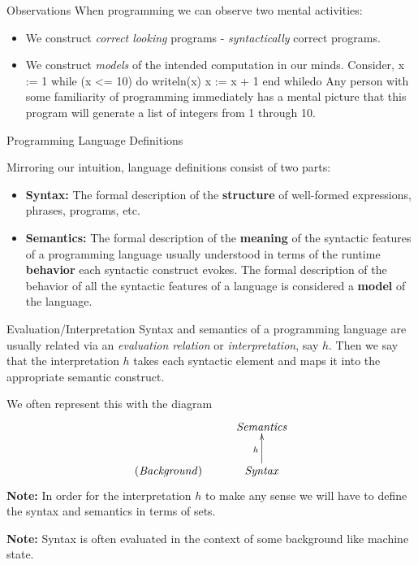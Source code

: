 \documentclass{beamer}
\begin{document}
\begin{frame}[fragile]{Observations}
When programming we can observe two mental activities:
\begin{itemize}
\item We construct {\em correct looking} programs - {\em syntactically} correct programs.
\item We construct {\em models} of the intended computation in our minds. Consider,
\bcode
x := 1
while (x <= 10) do
     writeln(x)
     x := x + 1
end whiledo
\ecode
Any person with some familiarity of programming immediately has a mental picture that this program
will generate a list of integers from 1 through 10.
\end{itemize}

\end{frame}

\begin{frame}{Programming Language Definitions}

Mirroring our intuition, language definitions consist of two parts:

\begin{itemize}

\item
{\bf Syntax:} The formal description of the
{\bf structure} of  well-formed expressions, phrases, programs, etc.

\item
{\bf Semantics:} The formal description of the {\bf  meaning} of the syntactic features of a programming language
usually understood in terms of the runtime {\bf behavior} each syntactic construct evokes.  The formal description of the behavior of all
the syntactic features of a language is considered a {\bf model} of the language.

\end{itemize}
\end{frame}

\begin{frame}{Evaluation/Interpretation}
Syntax and semantics of a programming language are usually related via an {\em evaluation relation}
or {\em interpretation}, say $h$.  Then we say that the interpretation $h$ takes each syntactic element and
maps it into the appropriate semantic construct.

\vspace{.1in}

We often represent this with the diagram
\[
\xymatrix{
&\mathit{Semantics}\\
\mathit{(Background)}& \mathit{Syntax}\ar[u]^h
}
\]
{\bf Note:} In order for the interpretation $h$ to make any sense we will have to define the syntax and
semantics in terms of sets.

{\bf Note:} Syntax is often evaluated in the context of some background like machine state.

\end{frame}
\end{document}
